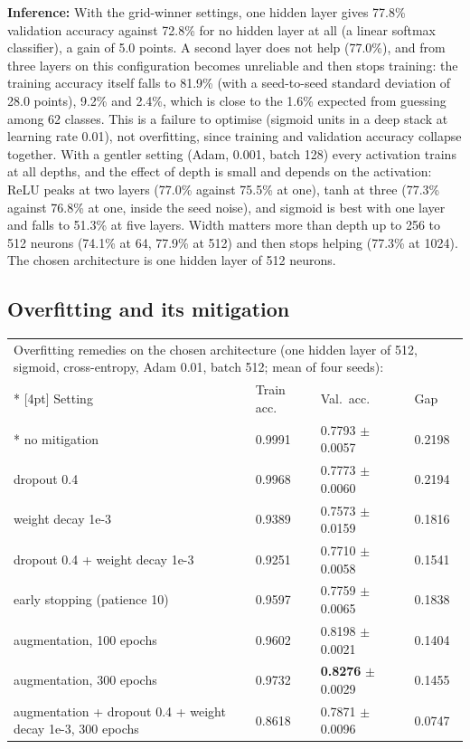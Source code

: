 \documentclass[12pt,a4paper]{article}
\begin{document}
\textbf{Inference:} With the grid-winner settings, one hidden layer gives
77.8\% validation accuracy against 72.8\% for no hidden layer
at all (a linear softmax classifier), a gain of 5.0 points. A
second layer does not help (77.0\%), and from three layers on this
configuration becomes unreliable and then stops training: the training accuracy itself falls to 81.9\%
(with a seed-to-seed standard deviation of 28.0 points),
9.2\% and 2.4\%, which is close to the 1.6\% expected from
guessing among 62 classes. This is a failure to optimise (sigmoid units in a deep stack at learning
rate 0.01), not overfitting, since training and validation accuracy collapse together. With a gentler
setting (Adam, 0.001, batch 128) every activation trains at all depths, and the effect of depth is
small and depends on the activation: ReLU peaks at two layers (77.0\%
against 75.5\% at one), tanh at three (77.3\%
against 76.8\% at one, inside the seed noise), and sigmoid is best with one
layer and falls to 51.3\% at five layers. Width matters more than depth
up to 256 to 512 neurons (74.1\% at 64,
77.9\% at 512) and then stops helping (77.3\% at 1024).
The chosen architecture is one hidden layer of 512 neurons.

\subsection*{Overfitting and its mitigation}
{\small\setlength{\tabcolsep}{4pt}
\begin{longtable}{p{7.0cm}p{2.0cm}p{3.0cm}p{1.8cm}}
\multicolumn{4}{l}{\parbox[t]{14.5cm}{Overfitting remedies on the chosen architecture (one hidden layer of 512, sigmoid, cross-entropy, Adam 0.01, batch 512; mean of four seeds):}} \\*
[4pt]
\toprule
Setting & Train acc. & Val.\ acc. & Gap \\*
\midrule
no mitigation & 0.9991 & 0.7793 $\pm$ 0.0057 & 0.2198 \\
dropout 0.4 & 0.9968 & 0.7773 $\pm$ 0.0060 & 0.2194 \\
weight decay 1e-3 & 0.9389 & 0.7573 $\pm$ 0.0159 & 0.1816 \\
dropout 0.4 + weight decay 1e-3 & 0.9251 & 0.7710 $\pm$ 0.0058 & 0.1541 \\
early stopping (patience 10) & 0.9597 & 0.7759 $\pm$ 0.0065 & 0.1838 \\
augmentation, 100 epochs & 0.9602 & 0.8198 $\pm$ 0.0021 & 0.1404 \\
augmentation, 300 epochs & 0.9732 & \textbf{0.8276} $\pm$ 0.0029 & 0.1455 \\
augmentation + dropout 0.4 + weight decay 1e-3, 300 epochs & 0.8618 & 0.7871 $\pm$ 0.0096 & 0.0747 \\
\bottomrule
\end{longtable}
}
\end{document}
